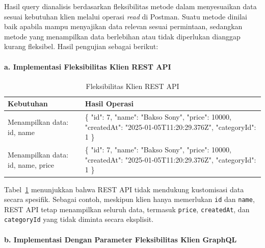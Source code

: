 \documentclass[
 manuscript=article,  %
  layout=publish, 
  year=2024, 
  month= Februari, %
  volume=8,
  number=1 
]{JIKO}
\begin{document}
Hasil query dianalisis berdasarkan fleksibilitas metode dalam menyesuaikan data sesuai kebutuhan klien melalui operasi \textit{read} di Postman. Suatu metode dinilai baik apabila mampu menyajikan data relevan sesuai permintaan, sedangkan metode yang menampilkan data berlebihan atau tidak diperlukan dianggap kurang fleksibel. Hasil pengujian sebagai berikut:

\paragraph{a. Implementasi Fleksibilitas Klien REST API}

\begin{table}[hbt!]
  \begin{threeparttable}
    \caption{Fleksibilitas Klien REST API}
    \label{tabel:restapi-flex}
    \begin{tabular}{lp{9cm}}
      \toprule
      \textbf{Kebutuhan} & \textbf{Hasil Operasi} \\
      \midrule
      Menampilkan data: id, name & \{ "id": 7, "name": "Bakso Sony", "price": 10000, "createdAt": "2025-01-05T11:20:29.376Z", "categoryId": 1 \} \\
      Menampilkan data: id, name, price & \{ "id": 7, "name": "Bakso Sony", "price": 10000, "createdAt": "2025-01-05T11:20:29.376Z", "categoryId": 1 \} \\
      \bottomrule
    \end{tabular}
  \end{threeparttable}
\end{table}


Tabel~\ref{tabel:restapi-flex} menunjukkan bahwa REST API tidak mendukung kustomisasi data secara spesifik. Sebagai contoh, meskipun klien hanya memerlukan \texttt{id} dan \texttt{name}, REST API tetap menampilkan seluruh data, termasuk \texttt{price}, \texttt{createdAt}, dan \texttt{categoryId} yang tidak diminta secara eksplisit.

\paragraph{b. Implementasi Dengan Parameter Fleksibilitas Klien GraphQL}
\end{document}
